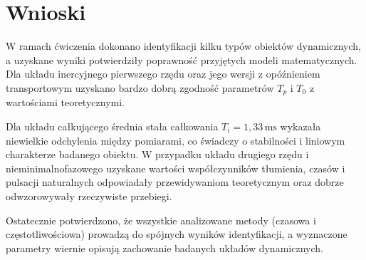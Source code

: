 \documentclass[12pt,a4paper]{article}
\begin{document}
	\section{Wnioski}
	
	W ramach ćwiczenia dokonano identyfikacji kilku typów obiektów dynamicznych, a uzyskane wyniki potwierdziły poprawność przyjętych modeli matematycznych. 
	Dla układu inercyjnego pierwszego rzędu oraz jego wersji z opóźnieniem transportowym uzyskano bardzo dobrą zgodność parametrów \(T_p\) i \(T_0\) z wartościami teoretycznymi. 
	
	Dla układu całkującego średnia stała całkowania \(T_i = 1{,}33\,\text{ms}\) wykazała niewielkie odchylenia między pomiarami, co świadczy o stabilności i liniowym charakterze badanego obiektu. 
	W przypadku układu drugiego rzędu i nieminimalnofazowego uzyskane wartości współczynników tłumienia, czasów i pulsacji naturalnych odpowiadały przewidywaniom teoretycznym oraz dobrze odwzorowywały rzeczywiste przebiegi.
	
	Ostatecznie potwierdzono, że wszystkie analizowane metody (czasowa i częstotliwościowa) prowadzą do spójnych wyników identyfikacji, a wyznaczone parametry wiernie opisują zachowanie badanych układów dynamicznych.
	
\end{document}
